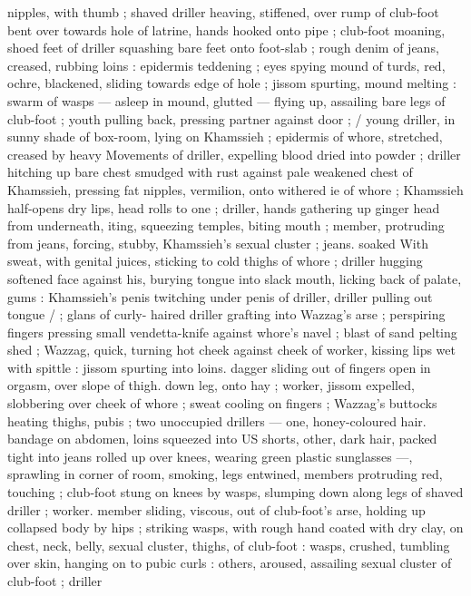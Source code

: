nipples, with thumb ; shaved driller heaving, stiffened, over rump of 
club-foot bent over towards hole of latrine, hands hooked onto pipe 
; club-foot moaning, shoed feet of driller squashing bare feet onto 
foot-slab ; rough denim of jeans, creased, rubbing loins : epidermis 
teddening ; eyes spying mound of turds, red, ochre, blackened, 
sliding towards edge of hole ; jissom spurting, mound melting : 
swarm of wasps --- asleep in mound, glutted --- flying up, assailing 
bare legs of club-foot ; youth pulling back, pressing partner against 
door ; {\slash} young driller, in sunny shade of box-room, lying on 
Khamssieh ; epidermis of whore, stretched, creased by heavy 
Movements of driller, expelling blood dried into powder ; driller 
hitching up bare chest smudged with rust against pale weakened 
chest of Khamssieh, pressing fat nipples, vermilion, onto withered 
ie of whore ; Khamssieh half-opens dry lips, head rolls to one 
; driller, hands gathering up ginger head from underneath, 
iting, squeezing temples, biting mouth ; member, protruding from 
jeans, forcing, stubby, Khamssieh's sexual cluster ; jeans. soaked 
With sweat, with genital juices, sticking to cold thighs of whore ; 
driller hugging softened face against his, burying tongue into slack 
mouth, licking back of palate, gums : Khamssieh's penis twitching 
under penis of driller, driller pulling out tongue {\slash} ; glans of curly- 
haired driller grafting into Wazzag's arse ; perspiring fingers 
pressing small vendetta-knife against whore's navel ; blast of sand 
pelting shed ; Wazzag, quick, turning hot cheek against cheek of 
worker, kissing lips wet with spittle : jissom spurting into loins. 
dagger sliding out of fingers open in orgasm, over slope of thigh. 
down leg, onto hay ; worker, jissom expelled, slobbering over cheek 
of whore ; sweat cooling on fingers ; Wazzag's buttocks heating 
thighs, pubis ; two unoccupied drillers --- one, honey-coloured hair. 
bandage on abdomen, loins squeezed into US shorts, other, dark 
hair, packed tight into jeans rolled up over knees, wearing green 
plastic sunglasses ---, sprawling in corner of room, smoking, legs 
entwined, members protruding red, touching ; club-foot stung on 
knees by wasps, slumping down along legs of shaved driller ; worker. 
member sliding, viscous, out of club-foot's arse, holding up 
collapsed body by hips ; striking wasps, with rough hand coated with 
dry clay, on chest, neck, belly, sexual cluster, thighs, of club-foot : 
wasps, crushed, tumbling over skin, hanging on to pubic curls : 
others, aroused, assailing sexual cluster of club-foot ; driller 
